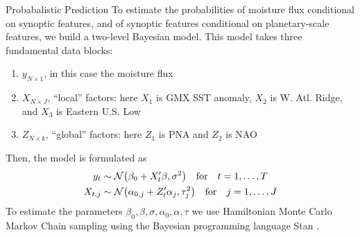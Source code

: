 \begin{block}{Probabalistic Prediction}
    To estimate the  probabilities of moisture flux conditional on synoptic features, and of synoptic features conditional on planetary-scale features, we build a two-level Bayesian model.
    This model takes three fundamental data blocks:
    \begin{enumerate}
        \item $y_{N \times 1}$, in this case the moisture flux
        \item $X_{N \times J}$, ``local'' factors: here $X_1$ is GMX SST anomaly, $X_2$ is W. Atl. Ridge, and $X_3$ is Eastern U.S. Low
        \item $Z_{N \times k}$, ``global'' factors: here $Z_1$ is PNA and $Z_2$ is NAO
    \end{enumerate}
    Then, the model is formulated as
    \begin{align}
        y_t & \sim \normal \qty(\beta_0 + X'_t \beta, \sigma^2) \qqtext{for} t = 1, \ldots, T \label{eq:yX}\\
        X_{t,j} &\sim \normal \qty(\alpha_{0,j} + Z'_t \alpha_j, \tau_j^2) \qqtext{for} j = 1, \ldots, J \label{eq:XZ}
    \end{align}
    To estimate the parameters $\beta_0, \beta, \sigma, \alpha_0, \alpha, \tau$ we use Hamiltonian Monte Carlo Markov Chain sampling using the Bayesian programming language Stan \cite{Carpenter2016}.
\end{block}
